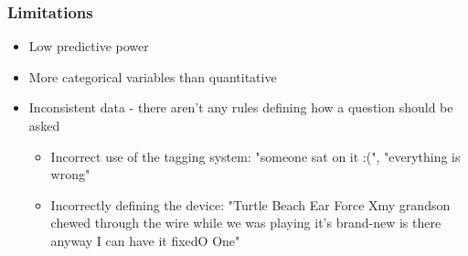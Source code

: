 \documentclass{beamer}
\begin{document}

\begin{frame}
\frametitle{Limitations}

  \begin{itemize}
      \item Low predictive power 
      \item More categorical variables than quantitative 
      \item Inconsistent data - there aren't any rules defining how a question should be asked
      \smallskip
      \begin{itemize}
          \item Incorrect use of the tagging system: "someone sat on it :(", "everything is wrong"
          \item Incorrectly defining the device: "Turtle Beach Ear Force Xmy grandson chewed through the wire while we was playing it's brand-new is there anyway I can have it fixedO One"
      \end{itemize}
  \end{itemize}

\end{frame}

 
\end{document}
